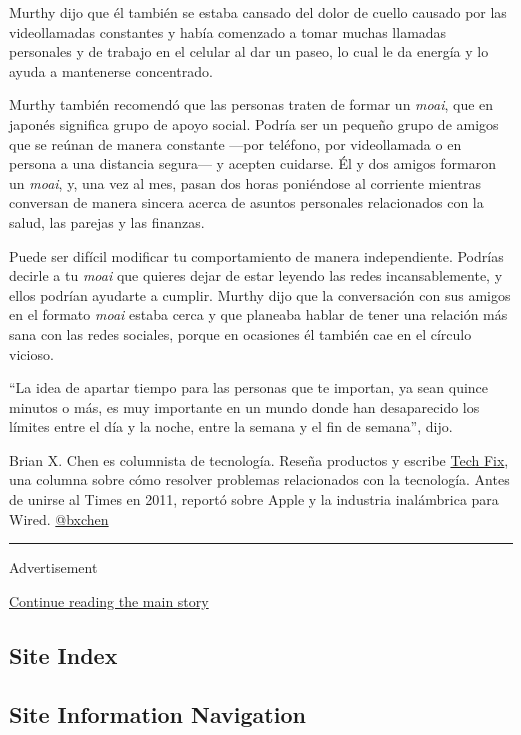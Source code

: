 Murthy dijo que él también se estaba cansado del dolor de cuello causado
por las videollamadas constantes y había comenzado a tomar muchas
llamadas personales y de trabajo en el celular al dar un paseo, lo cual
le da energía y lo ayuda a mantenerse concentrado.

Murthy también recomendó que las personas traten de formar un
\emph{moai}, que en japonés significa grupo de apoyo social. Podría ser
un pequeño grupo de amigos que se reúnan de manera constante ---por
teléfono, por videollamada o en persona a una distancia segura--- y
acepten cuidarse. Él y dos amigos formaron un \emph{moai}, y, una vez al
mes, pasan dos horas poniéndose al corriente mientras conversan de
manera sincera acerca de asuntos personales relacionados con la salud,
las parejas y las finanzas.

Puede ser difícil modificar tu comportamiento de manera independiente.
Podrías decirle a tu \emph{moai} que quieres dejar de estar leyendo las
redes incansablemente, y ellos podrían ayudarte a cumplir. Murthy dijo
que la conversación con sus amigos en el formato \emph{moai} estaba
cerca y que planeaba hablar de tener una relación más sana con las redes
sociales, porque en ocasiones él también cae en el círculo vicioso.

``La idea de apartar tiempo para las personas que te importan, ya sean
quince minutos o más, es muy importante en un mundo donde han
desaparecido los límites entre el día y la noche, entre la semana y el
fin de semana'', dijo.

Brian X. Chen es columnista de tecnología. Reseña productos y escribe
\href{https://www.nytimes3xbfgragh.onion/column/tech-fix}{Tech Fix}, una
columna sobre cómo resolver problemas relacionados con la tecnología.
Antes de unirse al Times en 2011, reportó sobre Apple y la industria
inalámbrica para Wired. \href{https://twitter.com/bxchen}{@bxchen}

\begin{center}\rule{0.5\linewidth}{\linethickness}\end{center}

Advertisement

\protect\hyperlink{after-bottom}{Continue reading the main story}

\hypertarget{site-index}{%
\subsection{Site Index}\label{site-index}}

\hypertarget{site-information-navigation}{%
\subsection{Site Information
Navigation}\label{site-information-navigation}}

